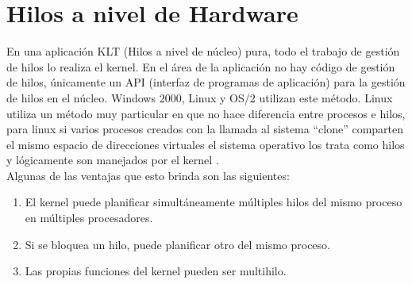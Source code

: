 \documentclass[11pt,letterpaper]{article}
\begin{document}





\section*{Hilos a nivel de Hardware}
En una aplicación KLT (Hilos a nivel de núcleo) pura, todo el trabajo de gestión de hilos lo realiza el kernel. En el área de la aplicación no hay código de gestión de hilos, únicamente un API (interfaz de programas de aplicación) para la gestión de hilos en el núcleo. Windows 2000, Linux y OS/2 utilizan este método. Linux utiliza un método muy particular en que no hace diferencia entre procesos e hilos, para linux si varios procesos creados con la llamada al sistema “clone” comparten el mismo espacio de direcciones virtuales el sistema operativo los trata como hilos y lógicamente son manejados por el kernel \cite{5:Online}.
\\
Algunas de las ventajas que esto brinda son las siguientes:
\begin{enumerate}
\item El kernel puede planificar simultáneamente múltiples hilos del mismo proceso en múltiples procesadores.
\item Si se bloquea un hilo, puede planificar otro del mismo proceso.
\item Las propias funciones del kernel pueden ser multihilo.
\end{enumerate}
\end{document}
